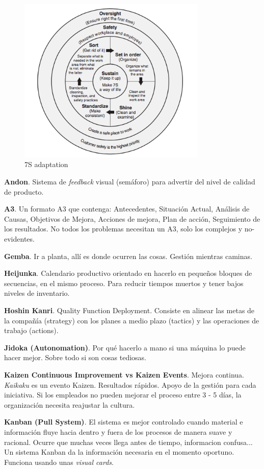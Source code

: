 \documentclass[]{article}
\begin{document}
\begin{figure}[ht!]
	\centering
	\includegraphics[width=90mm]{imagenes/7S.png}
	\caption{7S adaptation}
	\label{fig:Las7S}
\end{figure}


\textbf{Andon}. Sistema de \textit{feedback} visual (semáforo) para advertir del nivel de calidad de producto.

\textbf{A3}. Un formato A3 que contenga: Antecedentes, Situación Actual, Análisis de Causas, Objetivos de Mejora, Acciones de mejora, Plan de acción, Seguimiento de los resultados. No todos los problemas necesitan un A3, solo los complejos y no-evidentes.

\textbf{Gemba}. Ir a planta, allí es donde ocurren las cosas. Gestión mientras caminas.

\textbf{Heijunka}. Calendario productivo orientado en hacerlo en pequeños bloques de secuencias, en el mismo proceso. Para reducir tiempos muertos y tener bajos niveles de inventario.

\textbf{Hoshin Kanri}. Quality Function Deployment. Consiste en alinear las metas de la compañía (strategy) con los planes a medio plazo (tactics) y las operaciones de trabajo (actions). 

\textbf{Jidoka (Autonomation)}. Por qué hacerlo a mano si una máquina lo puede hacer mejor. Sobre todo si son cosas tediosas. 

\textbf{Kaizen Continuous Improvement vs Kaizen Events}. Mejora continua. \textit{Kaikaku} es un evento Kaizen. Resultados rápidos. Apoyo de la gestión para cada iniciativa. Si los empleados no pueden mejorar el proceso entre 3 - 5 días, la organización necesita reajustar la cultura.

\textbf{Kanban (Pull System)}. El sistema es mejor controlado cuando material e información fluye hacia dentro y fuera de los procesos de manera suave y racional. Ocurre que muchas veces llega antes de tiempo, informacion confusa... Un sistema Kanban da la información necesaria en el momento oportuno. Funciona usando unas \textit{visual cards}.
\end{document}
